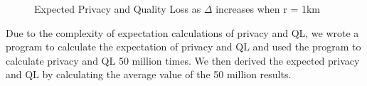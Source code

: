 \documentclass[a4paper,fleqn]{cas-dc}
\begin{document}
\begin{figure}
\centering
    \caption{ Expected Privacy and Quality Loss as $\Delta$ increases when r = 1km }
    \label{fig:foo}
\end{figure}

Due to the complexity of expectation calculations of privacy and QL, we wrote a program to calculate the expectation of privacy and $\mathrm{QL}$ and used the program to calculate privacy and QL 50 million times. We then derived the expected privacy and QL by calculating the average value of the 50 million results.
\end{document}
